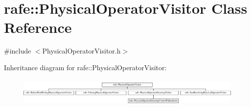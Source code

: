 \hypertarget{classrafe_1_1_physical_operator_visitor}{\section{rafe\+:\+:Physical\+Operator\+Visitor Class Reference}
\label{classrafe_1_1_physical_operator_visitor}
}


{\ttfamily \#include $<$Physical\+Operator\+Visitor.\+h$>$}

Inheritance diagram for rafe\+:\+:Physical\+Operator\+Visitor\+:\begin{figure}[H]
\begin{center}
\leavevmode
\includegraphics[height=1.409396cm]{classrafe_1_1_physical_operator_visitor}
\end{center}
\end{figure}
